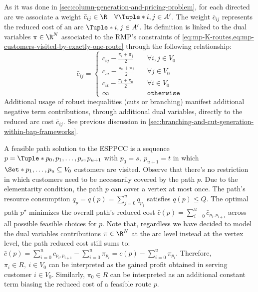As it was done in \cref{sec:column-generation-and-pricing-problem},
for each directed arc we associate a weight
$\bar{c}_{ij} \in \R \quad \forall \Tuple*{i, j} \in A^\prime$.
The weight $\bar{c}_{ij}$ represents the reduced cost of an arc $\Tuple*{i, j} \in A^\prime$.
Its definition is linked to the dual variables $\pi \in \R^N$ associated to
the RMP's constraints of \cref{eq:mp-K-routes,eq:mp-customers-visited-by-exactly-one-route}
through the following relationship:
\begin{equation}
	\bar{c}_{ij} = \begin{cases}
		c_{ij} - \frac{\pi_i + \pi_j}{2} & \quad \forall i, j \in V_0 \\
		c_{si} - \frac{\pi_0 + \pi_j}{2} & \quad \forall j \in V_0    \\
		c_{it} - \frac{\pi_i + \pi_0}{2} & \quad \forall i \in V_0    \\
		\infty                           & \quad \texttt{otherwise}
	\end{cases}
\end{equation}
Additional usage of robust inequalities (cuts or branching) manifest
additional negative term contributions, through additional dual variables,
directly to the reduced arc cost $\bar{c}_{ij}$.
See previous discussion in \cref{sec:branching-and-cut-generation-within-bap-frameworks}.

A feasible path solution to the ESPPCC is a sequence $p = \Tuple*{p_0, p_1, \dots, p_s, p_{u+1}}$
with $p_0 = s, \ p_{u + 1} = t$
in which $\Set*{p_1, \dots, p_u} \subseteq V_0$ customers are visited.
Observe that there's no restriction in which customers need to be necessarily covered
by the path $p$.
Due to the elementarity condition, the path $p$ can cover a vertex at most once.
The path's resource consumption $q_p = q(p) = \sum_{j=0}^{u} q_{p_j}$
satisfies $q(p) \le Q$.
The optimal path $p^\star$ minimizes the overall path's reduced cost
$\bar{c}(p) = \sum_{i=0}^{u} \bar{c}_{p_i,p_{i+1}}$ across all
possible feasible choices for $p$.
Note that, regardless we have decided to model
the dual variables contributions $\pi \in \R^N$
at the arc level instead at the vertex level,
the path reduced cost still sums to:
$\bar{c}(p) = \sum_{i=0}^{u} c_{p_i,p_{i+1}} - \sum_{i=0}^{u} \pi_{p_i} = c(p) - \sum_{i=0}^{u} \pi_{p_i}$.
Therefore, $\pi_i \in R,\ i \in V_0$ can be interpreted as the
gained profit obtained in serving customer $i \in V_0$.
Similarly,
$\pi_0 \in R$ can be interpreted as an additional constant term
biasing the reduced cost of a feasible route $p$.

